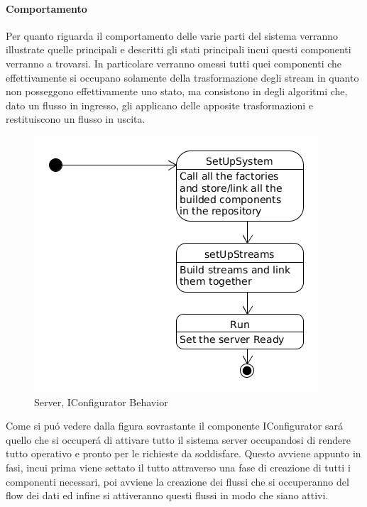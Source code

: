 \afterpage{\clearpage}

\newpage


\paragraph{Comportamento}

Per quanto riguarda il comportamento delle varie parti del sistema verranno illustrate quelle principali e descritti gli stati principali incui questi componenti verranno a trovarsi. In particolare verranno omessi tutti quei componenti che effettivamente si occupano solamente della trasformazione degli stream in quanto non posseggono effettivamente uno stato, ma consistono in degli algoritmi che, dato un flusso in ingresso, gli applicano delle apposite trasformazioni e restituiscono un flusso in uscita.

\begin{figure}[h]
\centering
\includegraphics[width=\textwidth]{Figures/LogicArchitecture/Server/IConfiguratorBehavior}
\caption{Server, IConfigurator Behavior}
\end{figure}

Come si pu\'o vedere dalla figura sovrastante il componente IConfigurator sar\'a quello che si occuper\'a di attivare tutto il sistema server occupandosi di rendere tutto operativo e pronto per le richieste da soddisfare. Questo avviene appunto in fasi, incui prima viene settato il tutto attraverso una fase di creazione di tutti i componenti necessari, poi avviene la creazione dei flussi che si occuperanno del flow dei dati ed infine si attiveranno questi flussi in modo che siano attivi.

